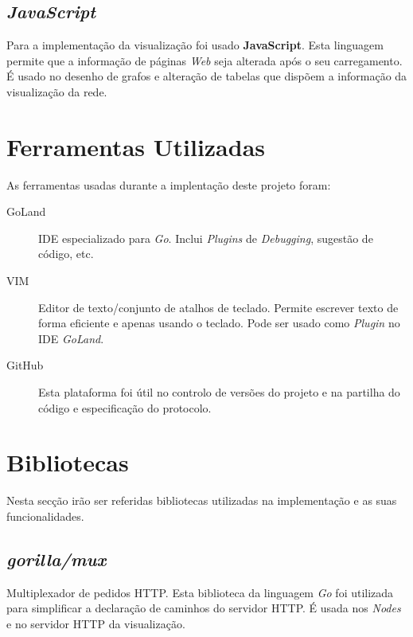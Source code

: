 


\subsection{\emph{JavaScript}}
Para a implementação da visualização foi usado \textbf{JavaScript}.
Esta linguagem permite que a informação de páginas \emph{Web} seja alterada após o seu carregamento.
É usado no desenho de grafos e alteração de tabelas que dispõem a informação da visualização da rede.



\section{Ferramentas Utilizadas}
As ferramentas usadas durante a implentação deste projeto foram:
\begin{description}
    \item [GoLand] \acs{IDE} especializado para \emph{Go}. Inclui \emph{Plugins} de \emph{Debugging}, sugestão de código, etc.
    \item [VIM] Editor de texto/conjunto de atalhos de teclado. Permite escrever texto de forma eficiente e apenas usando o teclado. Pode ser usado como \emph{Plugin} no \acs{IDE} \emph{GoLand}.
    \item [GitHub] Esta plataforma foi útil no controlo de versões do projeto e na partilha do código e especificação do protocolo.
\end{description}

\section{Bibliotecas}
\label{chap3:bibliotecas}
Nesta secção irão ser referidas bibliotecas utilizadas na implementação e as suas funcionalidades.

\subsection*{\emph{gorilla/mux}}
Multiplexador de pedidos \acs{HTTP}. Esta biblioteca da linguagem \emph{Go} foi utilizada para simplificar a declaração de caminhos do servidor \acs{HTTP}. É usada nos \emph{Nodes} e no servidor \acs{HTTP} da visualização.

